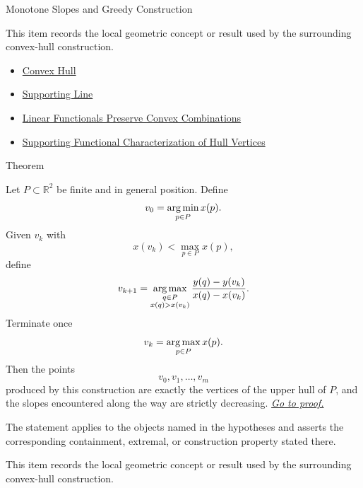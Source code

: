\begin{topicbox}{Monotone Slopes and Greedy Construction}
\begin{remark*}[Interpretation]
This item records the local geometric concept or result used by the surrounding
convex-hull construction.
\end{remark*}

\begin{dependencies}
\begin{itemize}
  \item \hyperref[def:computational-geometry-convex-hull]{Convex Hull}
  \item \hyperref[def:computational-geometry-supporting-line]{Supporting Line}
  \item \hyperref[lem:computational-geometry-linear-functionals-convex-combinations]{Linear Functionals Preserve Convex Combinations}
  \item \hyperref[thm:computational-geometry-supporting-functional-hull-vertices]{Supporting Functional Characterization of Hull Vertices}
\end{itemize}
\end{dependencies}

\begin{theorembox}{Theorem}
\begin{theorem}
\label{thm:computational-geometry-greedy-slope-upper-hull}
Let \(P\subset\mathbb{R}^2\) be finite and in general position. Define
\[
  v_0=\operatorname*{arg\,min}_{p\in P}x(p).
\]
Given \(v_k\) with
\[
  x(v_k)<\max_{p\in P}x(p),
\]
define
\[
  v_{k+1}
  =
  \operatorname*{arg\,max}_{\substack{q\in P\\x(q)>x(v_k)}}
  \frac{y(q)-y(v_k)}{x(q)-x(v_k)}.
\]
Terminate once
\[
  v_k=\operatorname*{arg\,max}_{p\in P}x(p).
\]
Then the points
\[
  v_0,v_1,\dots,v_m
\]
produced by this construction are exactly the vertices of the upper hull of
\(P\), and the slopes encountered along the way are strictly decreasing.
\hyperref[prf:computational-geometry-greedy-slope-upper-hull]{\textit{Go to proof.}}
\end{theorem}
\end{theorembox}

\begin{remark*}
The statement applies to the objects named in the hypotheses and asserts the
corresponding containment, extremal, or construction property stated there.
\end{remark*}

\begin{remark*}[Interpretation]
This item records the local geometric concept or result used by the surrounding
convex-hull construction.
\end{remark*}


\end{topicbox}
